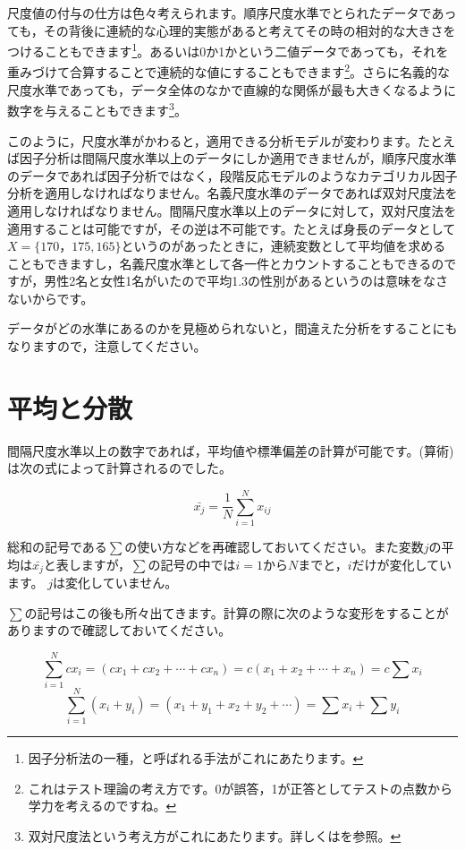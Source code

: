 \documentclass{ltjsbook}
\begin{document}
尺度値の付与の仕方は色々考えられます。順序尺度水準でとられたデータであっても，その背後に連続的な心理的実態があると考えてその時の相対的な大きさをつけることもできます\footnote{因子分析法の一種，と呼ばれる手法がこれにあたります。}。あるいは0か1かという二値データであっても，それを重みづけて合算することで連続的な値にすることもできます\footnote{これはテスト理論の考え方です。0が誤答，1が正答としてテストの点数から学力を考えるのですね。}。さらに名義的な尺度水準であっても，データ全体のなかで直線的な関係が最も大きくなるように数字を与えることもできます\footnote{双対尺度法という考え方がこれにあたります。詳しくは\textcite{Nishisato2010}を参照。}。

このように，尺度水準がかわると，適用できる分析モデルが変わります。たとえば因子分析は間隔尺度水準以上のデータにしか適用できませんが，順序尺度水準のデータであれば因子分析ではなく，段階反応モデルのようなカテゴリカル因子分析を適用しなければなりません。名義尺度水準のデータであれば双対尺度法を適用しなければなりません。間隔尺度水準以上のデータに対して，双対尺度法を適用することは可能ですが，その逆は不可能です。たとえば身長のデータとして$X=\{ 170，175, 165 \}$というのがあったときに，連続変数として平均値を求めることもできますし，名義尺度水準として各一件とカウントすることもできるのですが，男性2名と女性1名がいたので平均1.3の性別があるというのは意味をなさないからです。

データがどの水準にあるのかを見極められないと，間違えた分析をすることにもなりますので，注意してください。

\section{平均と分散}
\label{moment}
間隔尺度水準以上の数字であれば，平均値や標準偏差の計算が可能です。(算術)は次の式によって計算されるのでした。

\[  \bar{x_j} = \frac{1}{N} \sum_{i=1}^N x_{ij} \]

総和の記号である$\sum$の使い方などを再確認しておいてください。また変数$j$の平均は$\bar{x_j}$と表しますが，$\sum$の記号の中では$i=1$から$N$までと，$i$だけが変化しています。 $j$は変化していません。

$\sum$の記号はこの後も所々出てきます。計算の際に次のような変形をすることがありますので確認しておいてください。

\[ \sum_{i=1}^N cx_i = (cx_1 + cx_2 + \cdots + cx_n) = c(x_1 + x_2 + \cdots + x_n) =  c\sum x_i \]
\[ \sum_{i=1}^N (x_i + y_i) = (x_1 + y_1 + x_2 + y_2 + \cdots) = \sum x_i + \sum y_i \]
\end{document}
